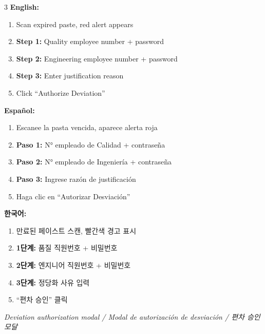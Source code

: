 \documentclass[12pt,a4paper]{article}
\begin{document}
\begin{multicols}{3}
\textbf{English:}
\begin{enumerate}[leftmargin=*]
\item Scan expired paste, red alert appears
\item \textbf{Step 1:} Quality employee number + password
\item \textbf{Step 2:} Engineering employee number + password
\item \textbf{Step 3:} Enter justification reason
\item Click ``Authorize Deviation''
\end{enumerate}

\columnbreak
\textbf{Español:}
\begin{enumerate}[leftmargin=*]
\item Escanee la pasta vencida, aparece alerta roja
\item \textbf{Paso 1:} N° empleado de Calidad + contraseña
\item \textbf{Paso 2:} N° empleado de Ingeniería + contraseña
\item \textbf{Paso 3:} Ingrese razón de justificación
\item Haga clic en ``Autorizar Desviación''
\end{enumerate}

\columnbreak
\textbf{한국어:}
\begin{enumerate}[leftmargin=*]
\item 만료된 페이스트 스캔, 빨간색 경고 표시
\item \textbf{1단계:} 품질 직원번호 + 비밀번호
\item \textbf{2단계:} 엔지니어 직원번호 + 비밀번호
\item \textbf{3단계:} 정당화 사유 입력
\item ``편차 승인'' 클릭
\end{enumerate}
\end{multicols}

\begin{photobox}
\centering
\vspace{4cm}
\textit{Deviation authorization modal / Modal de autorización de desviación / 편차 승인 모달}
\vspace{0.5cm}
\end{photobox}

\end{document}
